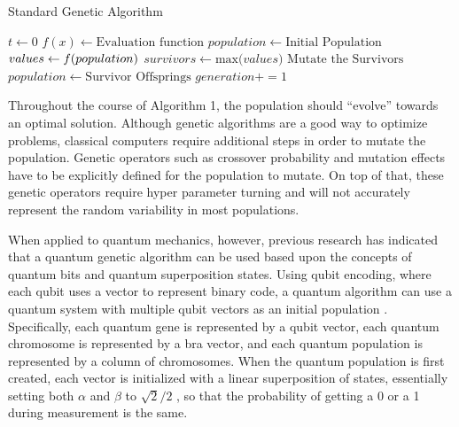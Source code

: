 \begin{algorithm}
\caption{Standard Genetic Algorithm}
\begin{algorithmic}[1]
\State $t \gets 0$
\State $f(x) \gets \text{Evaluation function}$
\State $population \gets \text{Initial Population}$
        \State $values \gets f(population\text)$
        \State $survivors \gets \text{max(}values\text{)}$
            \State $\text{Mutate the Survivors}$
            \State $population \gets \text{Survivor Offsprings}$
        \EndFor
        \State $generation += 1$
\EndWhile
\end{algorithmic}
\end{algorithm}


Throughout the course of Algorithm 1, the population should “evolve'' towards an optimal solution. Although genetic algorithms are a good way to optimize problems, classical computers require additional steps in order to mutate the population. Genetic operators such as crossover probability and mutation effects have to be explicitly defined for the population to mutate. On top of that, these genetic operators require hyper parameter turning and will not accurately represent the random variability in most populations. 

\vspace{1mm}

When applied to quantum mechanics, however, previous research has indicated that a quantum genetic algorithm can be used based upon the concepts of quantum bits and quantum superposition states. Using qubit encoding, where each qubit uses a vector to represent binary code, a quantum algorithm can use a quantum system with multiple qubit vectors as an initial population \cite{wu_improvement_2013}. Specifically, each quantum gene is represented by a qubit vector, each quantum chromosome is represented by a bra vector, and each quantum population is represented by a column of chromosomes. When the quantum population is first created, each vector is initialized with a linear superposition of states, essentially setting both $\alpha$ and $\beta$ to  $\sqrt{2} / 2$ , so that the probability of getting a 0 or a 1 during measurement is the same.

\vspace{1mm}

